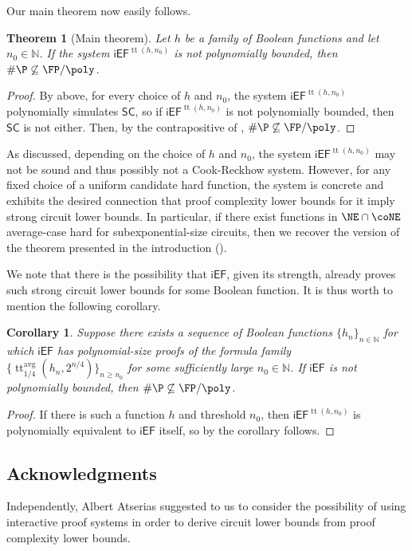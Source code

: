 \documentclass[11pt]{article}
\newcommand{\iEF}{\mathsf{iEF}}
\renewcommand{\SC}{\mathsf{SC}}
\theoremstyle{definition}
\theoremstyle{plain}
\newtheorem{theorem}[definition]{Theorem}
\newtheorem{corollary}[definition]{Corollary}
\theoremstyle{remark}
\DeclareMathOperator*{\ttt}{tt}
\newcommand{\ttable}{\ttt^{\operatorname{avg}}}
\newcommand{\bbN}{\mathbb{N}}
\begin{document}
Our main theorem now easily follows.

\begin{theorem}[Main theorem]
\label{thm:main-tech}
    Let $h$ be a family of Boolean functions and let $n_0 \in \bbN$. If the system $\iEF^{\operatorname{tt}(h, n_0)}$ is not polynomially bounded, then $\#\P \not\subseteq \FP/\poly$.
\end{theorem}

\begin{proof}
    By  above, for every choice of $h$ and $n_0$, the system $\iEF^{\operatorname{tt}(h, n_0)}$ polynomially simulates $\SC$, so if $\iEF^{\operatorname{tt}(h, n_0)}$ is not polynomially bounded, then $\SC$ is not either. Then, by the contrapositive of , $\#\P \not\subseteq \FP/\poly$.
\end{proof}

As discussed, depending on the choice of $h$ and $n_0$, the system $\iEF^{\operatorname{tt}(h, n_0)}$ may not be sound and thus possibly not a Cook-Reckhow system. However, for any fixed choice of a uniform candidate hard function, the system is concrete and exhibits the desired connection that proof complexity lower bounds for it imply strong circuit lower bounds. In particular, if there exist functions in $\NE \cap \coNE$ average-case hard for subexponential-size circuits, then we recover the version of the theorem presented in the introduction ().

We note that there is the possibility that $\iEF$, given its strength, already proves such strong circuit lower bounds for some Boolean function.  It is thus worth to mention the following corollary.

\begin{corollary}
    Suppose there exists a sequence of Boolean functions $\{h_n\}_{n\in\mathbb{N}}$ for which $\iEF$ has polynomial-size proofs of the formula family $\{\ttable_{1/4}(h_n, 2^{n/4})\}_{n\geq n_0}$ for some sufficiently large $n_0 \in \bbN$. If $\iEF$ is not polynomially bounded, then $\#\P \not\subseteq \FP/\poly$.
\end{corollary}

\begin{proof}
    If there is such a function $h$ and threshold $n_0$, then $\iEF^{\operatorname{tt}(h, n_0)}$ is polynomially equivalent to $\iEF$ itself, so by  the corollary follows.
\end{proof}

\subsection*{Acknowledgments}
Independently, Albert Atserias suggested to us to consider the possibility of using interactive proof systems in order to derive circuit lower bounds from proof complexity lower bounds.
\end{document}

